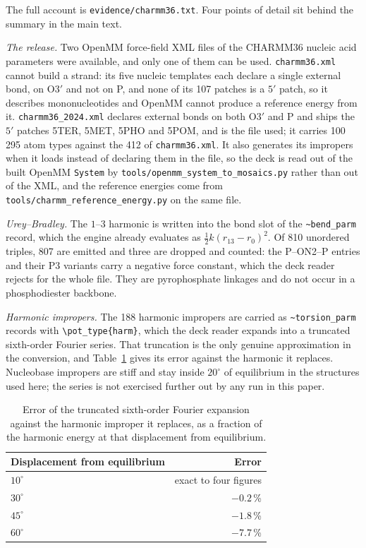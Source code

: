 The full account is \texttt{evidence/charmm36.txt}. Four points of
detail sit behind the summary in the main text.

\emph{The release.} Two OpenMM force-field XML files of the CHARMM36
nucleic acid parameters were available, and only one of them can be used.
\texttt{charmm36.xml} cannot build a strand: its five nucleic templates
each declare a single external bond, on O3$'$ and not on P, and none of its 107
patches is a $5'$ patch, so it describes mononucleotides and OpenMM cannot
produce a reference energy from it. \texttt{charmm36\_2024.xml} declares
external bonds on both O3$'$ and P and ships the $5'$ patches 5TER, 5MET, 5PHO
and 5POM, and is the file used; it carries 100\,295 atom types against the 412
of \texttt{charmm36.xml}. It also generates its impropers when it loads
instead of declaring them in the file, so the deck is read out of the built
OpenMM \texttt{System} by
\texttt{tools/openmm\_system\_to\_mosaics.py} rather than out of the XML,
and the reference energies come from
\texttt{tools/charmm\_reference\_energy.py} on the same file.

\emph{Urey--Bradley.} The $1$--$3$ harmonic is written into the bond slot
of the \texttt{\~{}bend\_parm} record, which the engine already evaluates
as $\tfrac{1}{2}k(r_{13}-r_0)^2$. Of 810 unordered triples, 807 are
emitted and three are dropped and counted: the P--ON2--P entries and their P3
variants carry a negative force constant, which the deck reader rejects for the
whole file. They are pyrophosphate linkages and do not occur in a
phosphodiester backbone.

\emph{Harmonic impropers.} The 188 harmonic impropers are carried as
\texttt{\~{}torsion\_parm} records with
\texttt{\textbackslash pot\_type\{harm\}}, which the deck reader expands
into a truncated sixth-order Fourier series. That truncation is the only genuine
approximation in the conversion, and Table~\ref{tab:si-improper} gives its error
against the harmonic it replaces. Nucleobase impropers are stiff and stay inside
$20^{\circ}$ of equilibrium in the structures used here; the series is
not exercised further out by any run in this paper.

\begin{table}[h]
\centering
\footnotesize
\caption{Error of the truncated sixth-order Fourier expansion against the
harmonic improper it replaces, as a fraction of the harmonic energy at that
displacement from equilibrium.}
\label{tab:si-improper}
\begin{tabular}{lr}
\toprule
Displacement from equilibrium & Error \\
\midrule
$10^{\circ}$ & exact to four figures \\
$30^{\circ}$ & $-0.2$\,\% \\
$45^{\circ}$ & $-1.8$\,\% \\
$60^{\circ}$ & $-7.7$\,\% \\
\bottomrule
\end{tabular}
\end{table}


